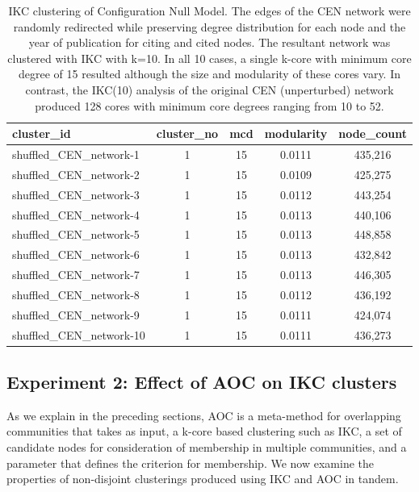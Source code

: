 \documentclass[12pt, oneside]{article}   	%
\begin{document}
\begin{table}[!h]
\centering
\captionsetup{width=0.9\textwidth}
\caption{IKC clustering of Configuration Null Model. The edges of the CEN network were randomly redirected while preserving degree distribution for each node and the year of publication for citing and cited nodes. 
The resultant network was clustered with IKC with k=10.  In all 10 cases, a single k-core with minimum core degree of 15 resulted although the size and modularity of these cores vary. In contrast, the IKC(10) analysis of the original CEN (unperturbed) network produced 128 cores  with minimum core degrees ranging from 10 to 52.}
\begin{tabular}{lcccc}
  \hline
cluster\_id & cluster\_no & mcd & modularity & node\_count  \\ 
  \hline
shuffled\_CEN\_network-1 &     1 &    15 & 0.0111 & 435,216 \\
shuffled\_CEN\_network-2 &     1 &    15 & 0.0109 & 425,275 \\
shuffled\_CEN\_network-3 &     1 &    15 & 0.0112 & 443,254 \\
shuffled\_CEN\_network-4 &     1 &    15 & 0.0113 & 440,106 \\
shuffled\_CEN\_network-5 &     1 &    15 & 0.0113 & 448,858 \\
shuffled\_CEN\_network-6 &     1 &    15 & 0.0113 & 432,842 \\
shuffled\_CEN\_network-7 &     1 &    15 & 0.0113 & 446,305 \\
shuffled\_CEN\_network-8 &     1 &    15 & 0.0112 & 436,192 \\
shuffled\_CEN\_network-9 &     1 &    15 & 0.0111 & 424,074 \\
shuffled\_CEN\_network-10 &    1 &   15 & 0.0111 & 436,273 \\ 
   \hline
\end{tabular}
\label{tab:tab1}
\end{table}

\subsection{Experiment 2: Effect of AOC on IKC clusters} As we explain in the preceding sections, AOC is a meta-method for overlapping communities that takes as input, a k-core based clustering such as IKC, a set of candidate nodes for consideration of membership in multiple communities, and a parameter that defines the criterion for membership. We now examine the properties of non-disjoint clusterings produced using IKC and AOC in tandem. 
\end{document}
